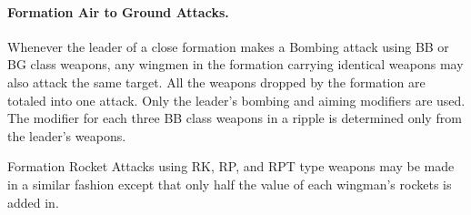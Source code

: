 \begin{advancedrules}
\paragraph{Formation Air to Ground Attacks.} Whenever the leader of a close formation makes a Bombing attack using BB or BG class weapons, any wingmen in the formation carrying identical weapons may also attack the same target. All the weapons dropped by the formation are totaled into one attack. Only the leader's bombing and aiming modifiers are used. The modifier for each three BB class weapons in a ripple is determined only from the leader's weapons.

Formation Rocket Attacks using RK, RP, and RPT type weapons may be made in a similar fashion except that only half the value of each wingman's rockets is added in.

\end{advancedrules}